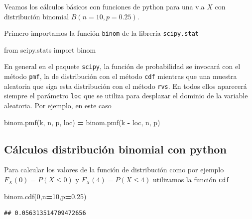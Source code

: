 \documentclass[]{book}
\newenvironment{Shaded}{\begin{snugshade}}{\end{snugshade}}
\newcommand{\DecValTok}[1]{\textcolor[rgb]{0.00,0.00,0.81}{#1}}
\newcommand{\FloatTok}[1]{\textcolor[rgb]{0.00,0.00,0.81}{#1}}
\newcommand{\ImportTok}[1]{#1}
\newcommand{\NormalTok}[1]{#1}
\newcommand{\OperatorTok}[1]{\textcolor[rgb]{0.81,0.36,0.00}{\textbf{#1}}}
\begin{document}
Veamos los cálculos básicos con funciones de python para una v.a \(X\) con distribución binomial \(B(n=10,p=0.25)\).

Primero importamos la función \texttt{binom} de la librería \texttt{scipy.stat}

\begin{Shaded}
\begin{Highlighting}[]
\ImportTok{from}\NormalTok{ scipy.stats }\ImportTok{import}\NormalTok{ binom}
\end{Highlighting}
\end{Shaded}

En general en el paquete \texttt{scipy}, la función de probabilidad se invocará con el método \texttt{pmf}, la de distribución con el método \texttt{cdf} mientras que una muestra aleatoria que siga esta distribución con el método \texttt{rvs}. En todos ellos aparecerá siempre el parámetro \texttt{loc} que se utiliza para desplazar el dominio de la variable aleatoria. Por ejemplo, en este caso

\begin{Shaded}
\begin{Highlighting}[]
\NormalTok{binom.pmf(k, n, p, loc) }\OperatorTok{=}\NormalTok{  binom.pmf(k }\OperatorTok{-}\NormalTok{ loc, n, p)}
\end{Highlighting}
\end{Shaded}

\hypertarget{cuxe1lculos-distribuciuxf3n-binomial-con-python-1}{%
\subsection{Cálculos distribución binomial con python}\label{cuxe1lculos-distribuciuxf3n-binomial-con-python-1}}

Para calcular los valores de la función de distribución como por ejemplo \(F_X(0)=P(X\leq 0)\) y \(F_X(4)=P(X\leq 4)\) utilizamos la función \texttt{cdf}

\begin{Shaded}
\begin{Highlighting}[]
\NormalTok{binom.cdf(}\DecValTok{0}\NormalTok{,n}\OperatorTok{=}\DecValTok{10}\NormalTok{,p}\OperatorTok{=}\FloatTok{0.25}\NormalTok{)}
\end{Highlighting}
\end{Shaded}

\begin{verbatim}
## 0.056313514709472656
\end{verbatim}
\end{document}

